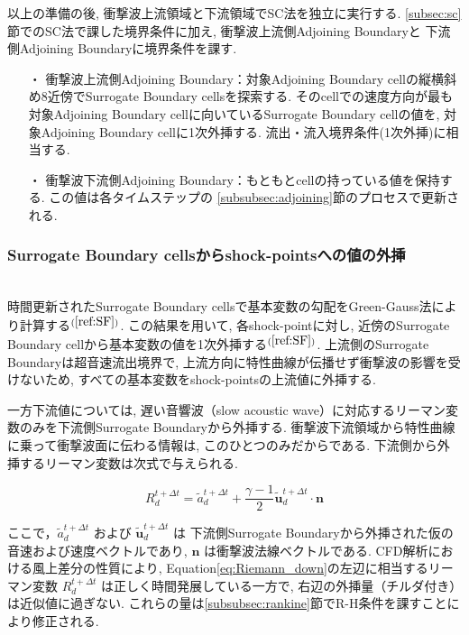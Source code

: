 \documentclass[a4j]{jarticle}
\begin{document}
以上の準備の後, 衝撃波上流領域と下流領域でSC法を独立に実行する. \ref{subsec:sc}節でのSC法で課した境界条件に加え, 衝撃波上流側Adjoining Boundaryと
下流側Adjoining Boundaryに境界条件を課す.
\begin{itemize}
  \item[・]  衝撃波上流側Adjoining Boundary：対象Adjoining Boundary cellの縦横斜め8近傍でSurrogate Boundary cellsを探索する. 
            そのcellでの速度方向が最も対象Adjoining Boundary cellに向いているSurrogate Boundary cellの値を, 対象Adjoining Boundary cellに1次外挿する. 流出・流入境界条件(1次外挿)に相当する.
  \item[・]  衝撃波下流側Adjoining Boundary：もともとcellの持っている値を保持する. この値は各タイムステップの
            \ref{subsubsec:adjoining}節のプロセスで更新される.
\end{itemize}

\subsubsection{Surrogate Boundary cellsからshock-pointsへの値の外挿} \label{subsubsec:extrapolate}
\mbox{}\\[-1.0ex]

時間更新されたSurrogate Boundary cellsで基本変数の勾配をGreen-Gauss法により計算する$^{(\ref{ref:SF})}$.
この結果を用いて, 各shock-pointに対し, 近傍のSurrogate Boundary cellから基本変数の値を1次外挿する$^{(\ref{ref:SF})}$.
上流側のSurrogate Boundaryは超音速流出境界で, 上流方向に特性曲線が伝播せず衝撃波の影響を受けないため, 
すべての基本変数をshock-pointsの上流値に外挿する.

一方下流値については, 遅い音響波（slow acoustic wave）に対応するリーマン変数のみを下流側Surrogate Boundaryから外挿する.
衝撃波下流領域から特性曲線に乗って衝撃波面に伝わる情報は, このひとつのみだからである.
下流側から外挿するリーマン変数は次式で与えられる.

\begin{equation}
    R_d^{t+\Delta t} = \tilde{a}_d^{t+\Delta t} + \frac{\gamma - 1}{2}\tilde{\mathbf{u}}_d^{t+\Delta t} \cdot \mathbf{n}
    \label{eq:Riemann_down}
\end{equation}

ここで，$\tilde{a}_d^{t+\Delta t}$ および $\tilde{\mathbf{u}}_d^{t+\Delta t}$ は
下流側Surrogate Boundaryから外挿された仮の音速および速度ベクトルであり, 
$\mathbf{n}$ は衝撃波法線ベクトルである.
CFD解析における風上差分の性質により,
Equation\ref{eq:Riemann_down}の左辺に相当するリーマン変数 $R_d^{t+\Delta t}$ は正しく時間発展している一方で,
右辺の外挿量（チルダ付き）は近似値に過ぎない.
これらの量は\ref{subsubsec:rankine}節でR-H条件を課すことにより修正される.
\end{document}
